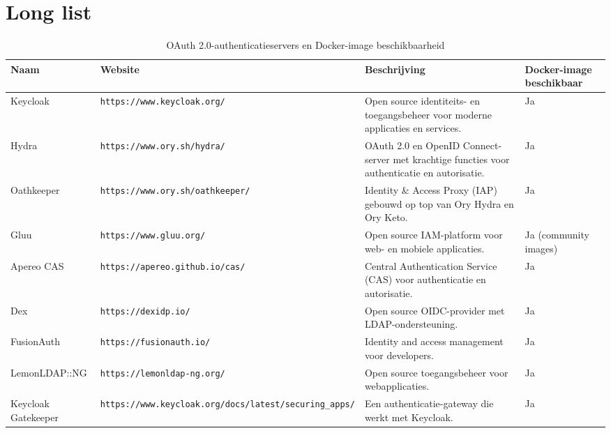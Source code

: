 \section{Long list}%
\label{sec:long-list}
\begin{table}[htbp]
  \centering
  \caption{OAuth 2.0-authenticatieservers en Docker-image beschikbaarheid}
  \label{tab:oauth_servers}
  \begin{adjustbox}{width=1\textwidth}
  \begin{tabular}{@{}llll@{}}
    \toprule
    Naam          & Website                               & Beschrijving                                                                   & Docker-image beschikbaar \\ \midrule
    Keycloak      & \texttt{https://www.keycloak.org/}     & Open source identiteits- en toegangsbeheer voor moderne applicaties en services. & Ja                        \\
    Hydra         & \texttt{https://www.ory.sh/hydra/}     & OAuth 2.0 en OpenID Connect-server met krachtige functies voor authenticatie en autorisatie. & Ja                        \\
    Oathkeeper & \texttt{https://www.ory.sh/oathkeeper/} & Identity \& Access Proxy (IAP) gebouwd op top van Ory Hydra en Ory Keto. & Ja                        \\
    Gluu          & \texttt{https://www.gluu.org/}         & Open source IAM-platform voor web- en mobiele applicaties.                   & Ja (community images)    \\
    Apereo CAS    & \texttt{https://apereo.github.io/cas/} & Central Authentication Service (CAS) voor authenticatie en autorisatie.      & Ja                        \\
    Dex           & \texttt{https://dexidp.io/}            & Open source OIDC-provider met LDAP-ondersteuning.                             & Ja                        \\
    FusionAuth    & \texttt{https://fusionauth.io/}        & Identity and access management voor developers.                               & Ja                        \\
    LemonLDAP::NG & \texttt{https://lemonldap-ng.org/}     & Open source toegangsbeheer voor webapplicaties.                               & Ja                        \\
    Keycloak Gatekeeper & \texttt{https://www.keycloak.org/docs/latest/securing\_apps/} & Een authenticatie-gateway die werkt met Keycloak.                     & Ja                        \\

\end{tabular}
\end{adjustbox}
\end{table}
